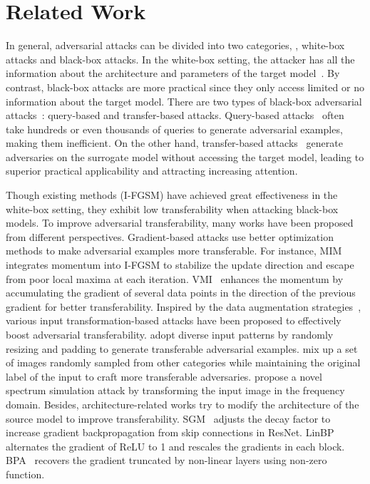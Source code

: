 \section{Related Work}

In general, adversarial attacks can be divided into two categories, \ie, white-box attacks and black-box attacks. In the white-box setting, the attacker has all the information about the architecture and parameters of the target model~\cite{goodfellow2015explaining, kurakin2017adversarial}. By contrast, black-box attacks are more practical since they only access limited or no information about the target model. There are two types of black-box adversarial attacks~\cite{gao2021staircase,wang2022boosting,chen2020HopSkipJumpAttack}: query-based and transfer-based attacks. Query-based attacks~\cite{ilyas2018black,shi2019curls} often take hundreds or even thousands of queries to generate adversarial examples, making them inefficient. On the other hand, transfer-based attacks~\cite{dong2019evading, lin2020nesterov} generate adversaries on the surrogate model without accessing the target model, leading to superior practical applicability and attracting increasing attention.

Though existing methods (\eg I-FGSM) have achieved great effectiveness in the white-box setting, they exhibit low transferability when attacking black-box models. To improve adversarial transferability, many works have been proposed from different perspectives. Gradient-based attacks use better optimization methods to make adversarial examples more transferable. For instance, MIM~\cite{dong2018boosting} integrates momentum into I-FGSM to stabilize the update direction and escape from poor local maxima at each iteration. VMI~\cite{wang2021enhancing} enhances the momentum by accumulating the gradient of several data points in the direction of the previous gradient for better transferability. Inspired by the data augmentation strategies~\cite{zhang2018mixup,verma2019manifold,yun2019cutmix}, various input transformation-based attacks have been proposed to effectively boost adversarial transferability. \cite{xie2019improving} adopt diverse input patterns by randomly resizing and padding to generate transferable adversarial examples. \cite{wang2021admix} mix up a set of images randomly sampled from other categories while maintaining the original label of the input to craft more transferable adversaries. \cite{long2022frequency} propose a novel spectrum simulation attack by transforming the input image in the frequency domain. Besides, architecture-related works try to modify the architecture of the source model to improve transferability. SGM~\cite{Wu2020Skip} adjusts the decay factor to increase gradient backpropagation from skip connections in ResNet. LinBP~\cite{guo2020backpropagating} alternates the gradient of ReLU to 1 and rescales the gradients in each block. BPA~\cite{wang2023rethinking} recovers the gradient truncated by non-linear layers using non-zero function.


